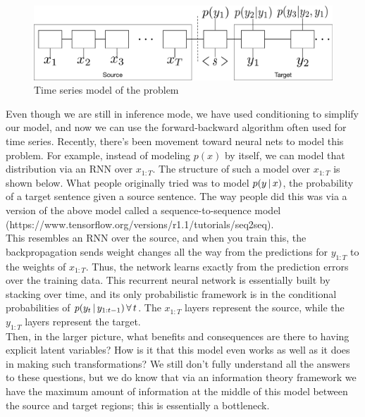 \documentclass{article}
\begin{document}
\begin{figure}[h]
    \centering
    \includegraphics[width=1.0\textwidth]{figs/nn.pdf}
    \caption{Time series model of the problem}
    \label{fig:timeseries}
\end{figure}

Even though we are still in inference mode, we have used conditioning to simplify our model, and now we can use the forward-backward algorithm often used for time series. Recently, there's been movement toward neural nets to model this problem. For example, instead of modeling $p(x)$ by itself, we can model that distribution via an RNN over $x_{1:T}$. The structure of such a model over $x_{1:T}$ is shown below. What people originally tried was to model $p(y \,|\, x)$, the probability of a target sentence given a source sentence. The way people did this was via a version of the above model called a sequence-to-sequence model (https://www.tensorflow.org/versions/r1.1/tutorials/seq2seq).\\

This resembles an RNN over the source, and when you train this, the backpropagation sends weight changes all the way from the predictions for $y_{1:T}$ to the weights of $x_{1:T}$. Thus, the network learns exactly from the prediction errors over the training data. This recurrent neural network is essentially built by stacking over time, and its only probabilistic framework is in the conditional probabilities of $p(y_t \,|\, y_{1:t-1}) \, \forall \, t$. The $x_{1:T}$ layers represent the source, while the $y_{1:T}$ layers represent the target.\\

Then, in the larger picture, what benefits and consequences are there to having explicit latent variables? How is it that this model even works as well as it does in making such transformations? We still don't fully understand all the answers to these questions, but we do know that via an information theory framework we have the maximum amount of information at the middle of this model between the source and target regions; this is essentially a bottleneck.\\
\end{document}
